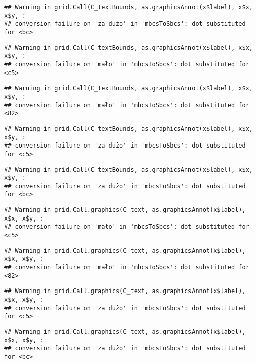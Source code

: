 \documentclass[
]{book}
\begin{document}
\begin{verbatim}
## Warning in grid.Call(C_textBounds, as.graphicsAnnot(x$label), x$x, x$y, :
## conversion failure on 'za dużo' in 'mbcsToSbcs': dot substituted for <bc>
\end{verbatim}

\begin{verbatim}
## Warning in grid.Call(C_textBounds, as.graphicsAnnot(x$label), x$x, x$y, :
## conversion failure on 'mało' in 'mbcsToSbcs': dot substituted for <c5>
\end{verbatim}

\begin{verbatim}
## Warning in grid.Call(C_textBounds, as.graphicsAnnot(x$label), x$x, x$y, :
## conversion failure on 'mało' in 'mbcsToSbcs': dot substituted for <82>
\end{verbatim}

\begin{verbatim}
## Warning in grid.Call(C_textBounds, as.graphicsAnnot(x$label), x$x, x$y, :
## conversion failure on 'za dużo' in 'mbcsToSbcs': dot substituted for <c5>
\end{verbatim}

\begin{verbatim}
## Warning in grid.Call(C_textBounds, as.graphicsAnnot(x$label), x$x, x$y, :
## conversion failure on 'za dużo' in 'mbcsToSbcs': dot substituted for <bc>
\end{verbatim}

\begin{verbatim}
## Warning in grid.Call.graphics(C_text, as.graphicsAnnot(x$label), x$x, x$y, :
## conversion failure on 'mało' in 'mbcsToSbcs': dot substituted for <c5>
\end{verbatim}

\begin{verbatim}
## Warning in grid.Call.graphics(C_text, as.graphicsAnnot(x$label), x$x, x$y, :
## conversion failure on 'mało' in 'mbcsToSbcs': dot substituted for <82>
\end{verbatim}

\begin{verbatim}
## Warning in grid.Call.graphics(C_text, as.graphicsAnnot(x$label), x$x, x$y, :
## conversion failure on 'za dużo' in 'mbcsToSbcs': dot substituted for <c5>
\end{verbatim}

\begin{verbatim}
## Warning in grid.Call.graphics(C_text, as.graphicsAnnot(x$label), x$x, x$y, :
## conversion failure on 'za dużo' in 'mbcsToSbcs': dot substituted for <bc>
\end{verbatim}
\end{document}

